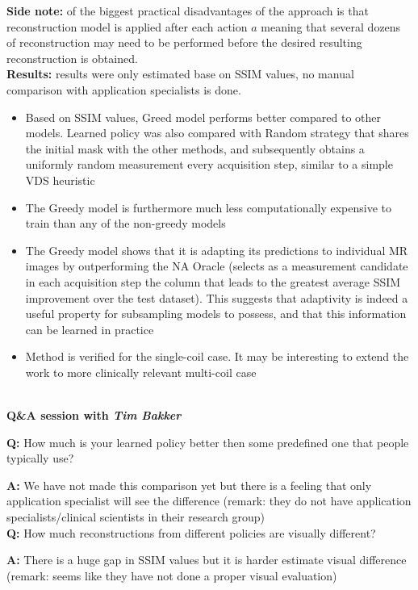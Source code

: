 {\bf Side note:} of the biggest practical disadvantages of the approach is that reconstruction model is applied after each action $a$ meaning that several dozens of reconstruction may need to be performed before the desired resulting reconstruction is obtained. \\

{\bf Results:} results were only estimated base on SSIM values, no manual comparison with application specialists is done.
\begin{itemize}
    \item Based on SSIM values, Greed model performs better compared to other models. Learned policy was also compared with Random strategy that shares the initial mask with the other methods, and subsequently obtains a uniformly random measurement every acquisition step, similar to a simple VDS heuristic \cite{Lustig2007SparseMRI}
    \item The Greedy model is furthermore much less computationally expensive to train than any of the non-greedy models
    \item The Greedy model shows that it is adapting its predictions to individual MR images by outperforming the NA Oracle (selects as a measurement candidate in each acquisition step the column that leads to the greatest average SSIM improvement over the test dataset).
    This suggests that adaptivity is indeed a useful property for subsampling models to possess, and that this information can be learned in practice
    \item Method is verified for the single-coil case.
    It may be interesting to extend the work to more clinically relevant multi-coil case
\end{itemize} \\

{\bf Q\&A session with \textit{Tim Bakker}}

\textbf{Q:} How much is your learned policy better then some predefined one that people typically use?  
    
\textbf{A:} We have not made this comparison yet but there is a feeling that only application specialist will see the difference (remark: they do not have application specialists/clinical scientists in their research group) \\

\textbf{Q:} How much reconstructions from different policies are visually different?  

\textbf{A:} There is a huge gap in SSIM values but it is harder estimate visual difference (remark: seems like they have not done a proper visual evaluation) \\

